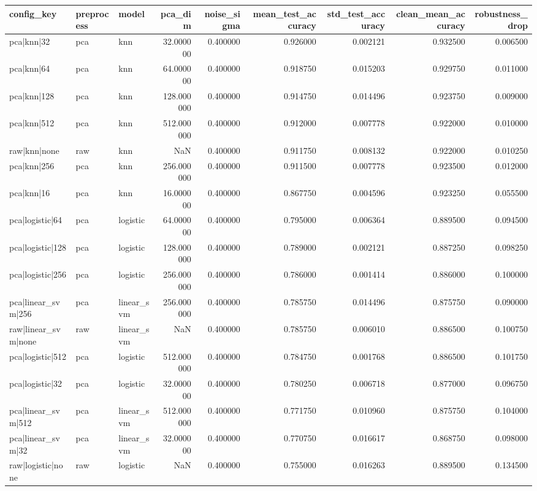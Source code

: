 \begin{tabular}{lllrrrrrr}
\toprule
config_key & preprocess & model & pca_dim & noise_sigma & mean_test_accuracy & std_test_accuracy & clean_mean_accuracy & robustness_drop \\
\midrule
pca|knn|32 & pca & knn & 32.000000 & 0.400000 & 0.926000 & 0.002121 & 0.932500 & 0.006500 \\
pca|knn|64 & pca & knn & 64.000000 & 0.400000 & 0.918750 & 0.015203 & 0.929750 & 0.011000 \\
pca|knn|128 & pca & knn & 128.000000 & 0.400000 & 0.914750 & 0.014496 & 0.923750 & 0.009000 \\
pca|knn|512 & pca & knn & 512.000000 & 0.400000 & 0.912000 & 0.007778 & 0.922000 & 0.010000 \\
raw|knn|none & raw & knn & NaN & 0.400000 & 0.911750 & 0.008132 & 0.922000 & 0.010250 \\
pca|knn|256 & pca & knn & 256.000000 & 0.400000 & 0.911500 & 0.007778 & 0.923500 & 0.012000 \\
pca|knn|16 & pca & knn & 16.000000 & 0.400000 & 0.867750 & 0.004596 & 0.923250 & 0.055500 \\
pca|logistic|64 & pca & logistic & 64.000000 & 0.400000 & 0.795000 & 0.006364 & 0.889500 & 0.094500 \\
pca|logistic|128 & pca & logistic & 128.000000 & 0.400000 & 0.789000 & 0.002121 & 0.887250 & 0.098250 \\
pca|logistic|256 & pca & logistic & 256.000000 & 0.400000 & 0.786000 & 0.001414 & 0.886000 & 0.100000 \\
pca|linear_svm|256 & pca & linear_svm & 256.000000 & 0.400000 & 0.785750 & 0.014496 & 0.875750 & 0.090000 \\
raw|linear_svm|none & raw & linear_svm & NaN & 0.400000 & 0.785750 & 0.006010 & 0.886500 & 0.100750 \\
pca|logistic|512 & pca & logistic & 512.000000 & 0.400000 & 0.784750 & 0.001768 & 0.886500 & 0.101750 \\
pca|logistic|32 & pca & logistic & 32.000000 & 0.400000 & 0.780250 & 0.006718 & 0.877000 & 0.096750 \\
pca|linear_svm|512 & pca & linear_svm & 512.000000 & 0.400000 & 0.771750 & 0.010960 & 0.875750 & 0.104000 \\
pca|linear_svm|32 & pca & linear_svm & 32.000000 & 0.400000 & 0.770750 & 0.016617 & 0.868750 & 0.098000 \\
raw|logistic|none & raw & logistic & NaN & 0.400000 & 0.755000 & 0.016263 & 0.889500 & 0.134500 \\

\end{tabular}
